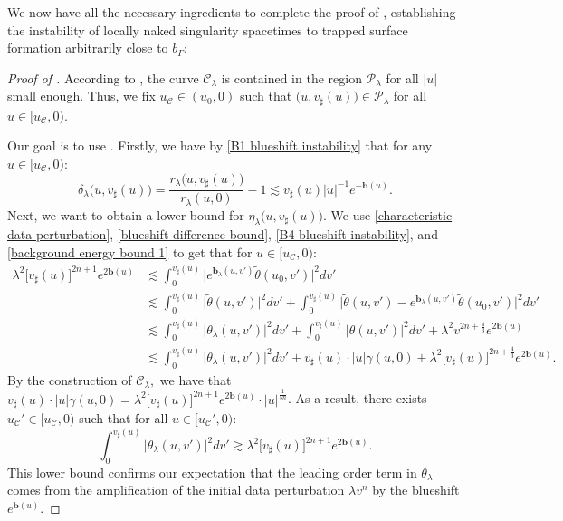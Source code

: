 \documentclass[11pt]{article}
\numberwithin{equation}{section}
\begin{document}
We now have all the necessary ingredients to complete the proof of , establishing the instability of locally naked singularity spacetimes to trapped surface formation arbitrarily close to $b_{\Gamma}$:
\begin{proof}[Proof of ]
    According to , the curve $\mathcal{C}_{\lambda}$ is contained in the region $\mathcal{P}_{\lambda}$ for all $|u|$ small enough. Thus, we fix $u_{\mathcal{C}}\in(u_0,0)$ such that $\big(u,v_{\sharp}(u)\big)\in\mathcal{P}_{\lambda}$ for all $u\in[u_{\mathcal{C}},0).$

    Our goal is to use . Firstly, we have by \eqref{B1 blueshift instability} that for any $u\in[u_{\mathcal{C}},0):$
    \begin{equation}\label{bound for delta lambda}
        \delta_{\lambda}\big(u,v_{\sharp}(u)\big)=\frac{r_{\lambda}\big(u,v_{\sharp}(u)\big)}{r_{\lambda}(u,0)}-1\lesssim v_{\sharp}(u)|u|^{-1}e^{-\mathbf{b}(u)}.
    \end{equation}
    Next, we want to obtain a lower bound for $\eta_{\lambda}\big(u,v_{\sharp}(u)\big).$ We use \eqref{characteristic data perturbation}, \eqref{blueshift difference bound}, \eqref{B4 blueshift instability}, and \eqref{background energy bound 1} to get that for $u\in[u_{\mathcal{C}},0):$
    \begin{align*}
        \lambda^2\big[v_{\sharp}(u)\big]^{2n+1}e^{2\mathbf{b}(u)}&\lesssim\int_0^{v_{\sharp}(u)}\Big|e^{\mathbf{b}_{\lambda}(u,v')}\widetilde{\theta}(u_0,v')\Big|^2dv'\\&\lesssim\int_0^{v_{\sharp}(u)}\big|\widetilde{\theta}(u,v')\big|^2dv'+\int_0^{v_{\sharp}(u)}\Big|\widetilde{\theta}(u,v')-e^{\mathbf{b}_{\lambda}(u,v')}\widetilde{\theta}(u_0,v')\Big|^2dv'\\
        &\lesssim\int_0^{v_{\sharp}(u)}\big|\theta_{\lambda}(u,v')\big|^2dv'+\int_0^{v_{\sharp}(u)}\big|\theta(u,v')\big|^2dv'+\lambda^2v^{2n+\frac{4}{3}}e^{2\mathbf{b}(u)}\\
        &\lesssim\int_0^{v_{\sharp}(u)}\big|\theta_{\lambda}(u,v')\big|^2dv'+v_{\sharp}(u)\cdot|u|\gamma(u,0)+\lambda^2\big[v_{\sharp}(u)\big]^{2n+\frac{4}{3}}e^{2\mathbf{b}(u)}.
    \end{align*}
    By the construction of $\mathcal{C}_{\lambda},$ we have that $v_{\sharp}(u)\cdot|u|\gamma(u,0)=\lambda^2\big[v_{\sharp}(u)\big]^{2n+1}e^{2\mathbf{b}(u)}\cdot|u|^{\frac{1}{5n}}$. As a result, there exists $u_{\mathcal{C}}'\in[u_{\mathcal{C}},0)$ such that for all $u\in[u_{\mathcal{C}}',0):$
    \begin{equation}\label{lower bound for theta lambda}
        \int_0^{v_{\sharp}(u)}\big|\theta_{\lambda}(u,v')\big|^2dv'\gtrsim\lambda^2\big[v_{\sharp}(u)\big]^{2n+1}e^{2\mathbf{b}(u)}.
    \end{equation}
    This lower bound confirms our expectation that the leading order term in $\theta_{\lambda}$ comes from the amplification of the initial data perturbation $\lambda v^n$ by the blueshift $e^{\mathbf{b}(u)}.$


\end{proof}
\end{document}
